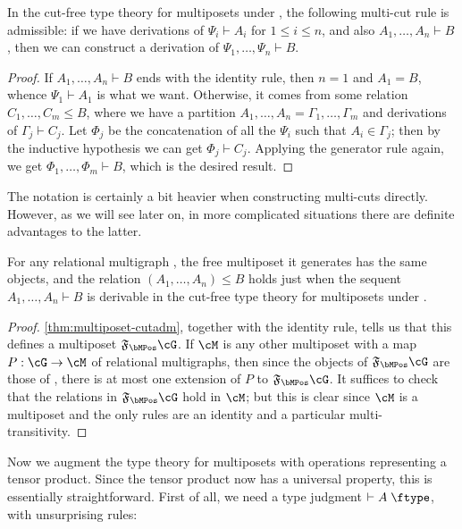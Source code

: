 \documentclass{book}
\let\types\vdash
\def\type{\;\ftype}
\newcommand{\F}[1]{\mathfrak{F}_{#1}}
\def\one{\mathbf{1}}
\let\tensor\otimes
\begin{document}
\begin{thm}\label{thm:multiposet-multicutadm}
  In the cut-free type theory for multiposets under \cG, the following multi-cut rule is admissible: if we have derivations of $\Psi_i\types A_i$ for $1\le i\le n$, and also $A_1,\dots,A_n \types B$, then we can construct a derivation of $\Psi_1,\dots,\Psi_n\types B$.
\end{thm}
\begin{proof}
  If $A_1,\dots,A_n \types B$ ends with the identity rule, then $n=1$ and $A_1=B$, whence $\Psi_1\types A_1$ is what we want.
  Otherwise, it comes from some relation $C_1,\dots,C_m \le B$, where we have a partition $A_1,\dots,A_n = \Gamma_1,\dots,\Gamma_m$ and derivations of $\Gamma_j \types C_j$.
  Let $\Phi_j$ be the concatenation of all the $\Psi_i$ such that $A_i \in \Gamma_j$; then by the inductive hypothesis we can get $\Phi_j\types C_j$.
  Applying the generator rule again, we get $\Phi_1,\dots,\Phi_m \types B$, which is the desired result.
\end{proof}

The notation is certainly a bit heavier when constructing multi-cuts directly.
However, as we will see later on, in more complicated situations there are definite advantages to the latter.

\begin{thm}\label{thm:multiposet-initial}
  For any relational multigraph \cG, the free multiposet it generates has the same objects, and the relation $(A_1,\dots,A_n)\le B$ holds just when the sequent $A_1,\dots,A_n\types B$ is derivable in the cut-free type theory for multiposets under \cG.
\end{thm}
\begin{proof}
  \cref{thm:multiposet-cutadm}, together with the identity rule, tells us that this defines a multiposet $\F\bMPos\cG$.
  If $\cM$ is any other multiposet with a map $P:\cG\to\cM$ of relational multigraphs, then since the objects of $\F\bMPos\cG$ are those of \cG, there is at most one extension of $P$ to $\F\bMPos\cG$.
  It suffices to check that the relations in $\F\bMPos\cG$ hold in $\cM$; but this is clear since $\cM$ is a multiposet and the only rules are an identity and a particular multi-transitivity.
\end{proof}

Now we augment the type theory for multiposets with operations representing a tensor product.
Since the tensor product now has a universal property, this is essentially straightforward.
First of all, we need a type judgment $\types A\type$, with unsurprising rules:
\end{document}
